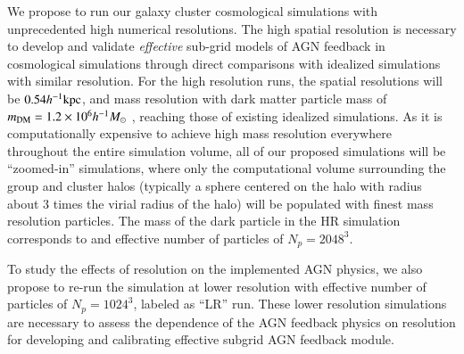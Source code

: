 \documentclass[letterpaper,11pt]{article}
\begin{document}
We propose to run our galaxy cluster cosmological simulations with unprecedented high numerical resolutions. The high spatial resolution is necessary to develop and validate {\em effective} sub-grid models of AGN feedback in cosmological simulations through direct comparisons with idealized simulations with similar resolution. 
For the high resolution runs, the spatial resolutions will be $0.54 h^{-1}{\rm kpc}$, and mass resolution with dark matter particle mass of $m_{\rm DM} = 1.2 \times 10^6 h^{-1}M_\odot$ , reaching those of existing idealized simulations. As it is computationally expensive to achieve high mass resolution everywhere throughout the entire simulation volume, all of our proposed simulations will be ``zoomed-in'' simulations, where only the computational volume surrounding the group and cluster halos (typically a sphere centered on the halo with radius about 3 times the virial radius of the halo) will be populated with finest mass resolution particles. The mass of the dark particle in the HR simulation corresponds to and effective number of particles of $N_p=2048^3$. 


To study the effects of resolution on the implemented AGN physics, we also propose to re-run the simulation at lower resolution with effective number of particles of $N_p=1024^3$, labeled as ``LR'' run.  These lower resolution simulations are necessary to assess the dependence of the AGN feedback physics on resolution for developing and calibrating effective subgrid AGN feedback module. 
\end{document}
